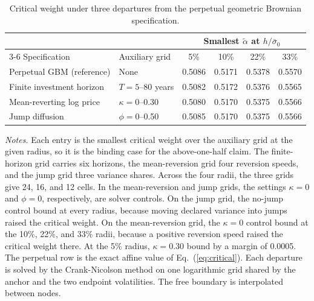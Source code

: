 \documentclass[5p,times,authoryear]{elsarticle}
\theoremstyle{plain}
\newcommand{\sbar}{\bar{\sigma}_0}
\begin{document}
\begin{table}[!t]
\caption{Critical weight under three departures from the perpetual geometric Brownian specification.}
\label{tab:departures}
\centering
\footnotesize

\begin{tabular}{@{}llcccc@{}}
\toprule
 & & \multicolumn{4}{c}{Smallest $\tilde{\alpha}$ at $h/\sbar$}\\
\cmidrule(l){3-6}
Specification & Auxiliary grid & 5\% & 10\% & 22\% & 33\%\\
\midrule
Perpetual GBM (reference) & None & 0.5086 & 0.5171 & 0.5378 & 0.5570\\
Finite investment horizon & $T=5$--80 years & 0.5082 & 0.5172 & 0.5376 & 0.5565\\
Mean-reverting log price & $\kappa=0$--0.30 & 0.5080 & 0.5170 & 0.5375 & 0.5566\\
Jump diffusion & $\phi=0$--0.50 & 0.5085 & 0.5170 & 0.5375 & 0.5566\\
\bottomrule
\end{tabular}
\par\smallskip
\parbox{\columnwidth}{\footnotesize\emph{Notes.} Each entry is the smallest critical weight over the auxiliary grid at the given radius, so it is the binding case for the above-one-half claim. The finite-horizon grid carries six horizons, the mean-reversion grid four reversion speeds, and the jump grid three variance shares. Across the four radii, the three grids give 24, 16, and 12 cells. In the mean-reversion and jump grids, the settings $\kappa=0$ and $\phi=0$, respectively, are solver controls. On the jump grid, the no-jump control bound at every radius, because moving declared variance into jumps raised the critical weight. On the mean-reversion grid, the $\kappa=0$ control bound at the 10\%, 22\%, and 33\% radii, because a positive reversion speed raised the critical weight there. At the 5\% radius, $\kappa=0.30$ bound by a margin of 0.0005. The perpetual row is the exact affine value of Eq.~(\ref{eq:critical}). Each departure is solved by the Crank-Nicolson method on one logarithmic grid shared by the anchor and the two endpoint volatilities. The free boundary is interpolated between nodes.}
\end{table}
\end{document}

